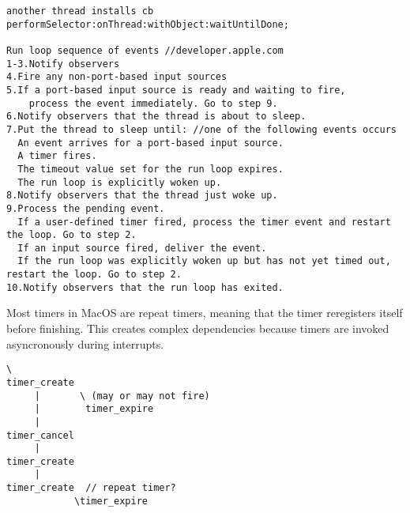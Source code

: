 {\footnotesize \begin{verbatim}
another thread installs cb
performSelector:onThread:withObject:waitUntilDone;

Run loop sequence of events //developer.apple.com
1-3.Notify observers
4.Fire any non-port-based input sources
5.If a port-based input source is ready and waiting to fire,
	process the event immediately. Go to step 9.
6.Notify observers that the thread is about to sleep.
7.Put the thread to sleep until: //one of the following events occurs
  An event arrives for a port-based input source.
  A timer fires.
  The timeout value set for the run loop expires.
  The run loop is explicitly woken up.
8.Notify observers that the thread just woke up.
9.Process the pending event.
  If a user-defined timer fired, process the timer event and restart the loop. Go to step 2.
  If an input source fired, deliver the event.
  If the run loop was explicitly woken up but has not yet timed out, restart the loop. Go to step 2.
10.Notify observers that the run loop has exited.

\end{verbatim}
}

Most timers in MacOS are repeat timers, meaning that the timer reregisters itself before finishing.
This creates complex dependencies because timers are invoked asyncronously during interrupts.

{\footnotesize \begin{verbatim}
\
timer_create
     |       \ (may or may not fire)
     |        timer_expire
     |
timer_cancel
     |
timer_create
     |
timer_create  // repeat timer?
            \timer_expire

\end{verbatim}
}
